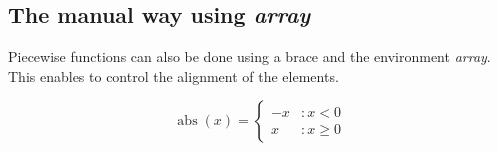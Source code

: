 \documentclass{article}
\begin{document}
\subsection*{The manual way using \emph{array}}

Piecewise functions can also be done using a brace and the environment \emph{array}. This enables to control the alignment of the elements.

\[
	\operatorname{abs}(x)=
	\left\{
	\begin{array}{lr}
		-x	& : x < 0 \\
		x	& : x \ge 0
	\end{array}
	\right.
\]
\end{document}
